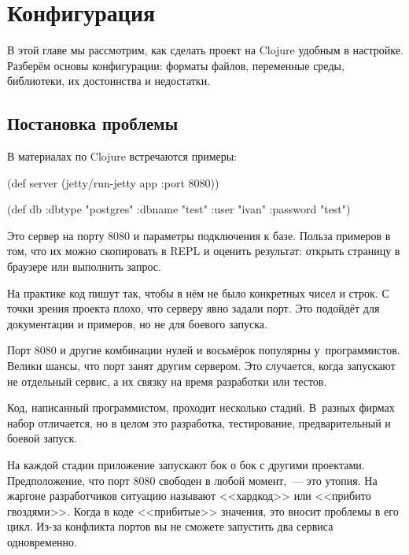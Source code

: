 \chapter{Конфигурация}


\label{chapter-config}

\begin{teaser}
В этой главе мы рассмотрим, как сделать проект на Clojure удобным в
настройке. Разберём основы конфигурации: форматы файлов, переменные среды,
библиотеки, их достоинства и недостатки.
\end{teaser}

\section{Постановка проблемы}

В материалах по Clojure встречаются примеры:

\begin{english}
  \begin{clojure}
(def server
  (jetty/run-jetty app {:port 8080}))

(def db {:dbtype   "postgres"
         :dbname   "test"
         :user     "ivan"
         :password "test"})
  \end{clojure}
\end{english}

Это сервер на порту 8080 и параметры подключения к базе. Польза примеров в том,
что их можно скопировать в REPL и оценить результат: открыть страницу в браузере
или выполнить запрос.

На практике код пишут так, чтобы в нём не было конкретных чисел и строк. С точки
зрения проекта плохо, что серверу явно задали порт. Это подойдёт для
документации и примеров, но не для боевого запуска.

Порт 8080 и другие комбинации нулей и восьмёрок популярны
у~программистов. Велики шансы, что порт занят другим сервером. Это случается,
когда запускают не отдельный сервис, а их связку на время разработки или тестов.

Код, написанный программистом, проходит несколько стадий. В~разных фирмах набор
отличается, но в целом это разработка, тестирование, предварительный и боевой
запуск.

\label{hardcode}

На каждой стадии приложение запускают бок о бок с другими
проектами. Предположение, что порт 8080 свободен в любой момент,~--- это
утопия. На жаргоне разработчиков ситуацию называют <<хардкод>> 
или <<прибито гвоздями>>. Когда в коде <<прибитые>> значения, это вносит
проблемы в его цикл. Из-за конфликта портов вы не сможете запустить два сервиса
одновременно.

